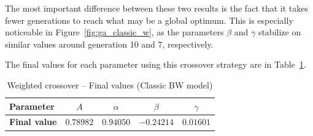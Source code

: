 The most important difference between these two results is the fact that
it takes fewer generations to reach what may be a global optimum.
This is especially noticeable in Figure~\ref{fig:ga_classic_w},
as the parameters $\beta$ and $\gamma$ stabilize on similar values
around generation 10 and 7, respectively.

The final values for each parameter using this crossover strategy
are in Table~\ref{tab:ga_classic_weighted_final}.

\begin{table}[H]
	\centering
	\begin{tabular}{l c c c c}
		\toprule
		\textbf{Parameter}		& $A$	& $\alpha$	& $\beta$	& $\gamma$ 	\\ \midrule
		\textbf{Final value}	& $0.78982$	& $0.94050$	& $-0.24214$ & $0.01601$	\\ \bottomrule
	\end{tabular}
	\caption{Weighted crossover -- Final values (Classic BW model)}
	\label{tab:ga_classic_weighted_final}
\end{table}

